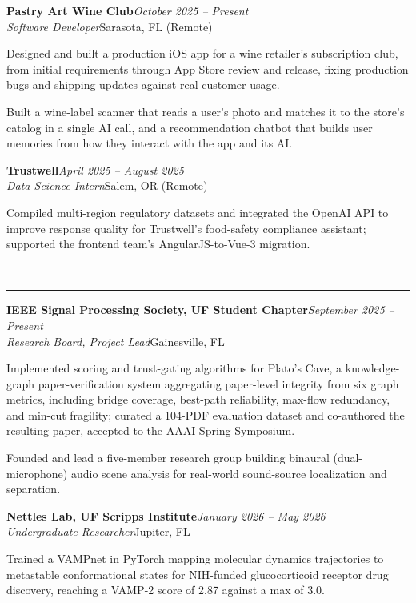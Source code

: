 \documentclass[10pt,letterpaper]{article}
\newcommand{\rsection}[1]{%
  \vspace{0.3em}%
  \noindent{\bfseries\scshape #1}\\[-0.42em]
  \noindent\rule{\textwidth}{0.6pt}\par\vspace{0.12em}%
}
\newenvironment{tight}{%
  \begin{list}{\textbullet}{%
    \setlength{\leftmargin}{1.1em}%
    \setlength{\labelwidth}{0.8em}%
    \setlength{\labelsep}{0.4em}%
    \setlength{\itemsep}{0.03em}%
    \setlength{\parsep}{0pt}%
    \setlength{\topsep}{0.09em}%
    \setlength{\partopsep}{0pt}%
    \setlength{\listparindent}{0pt}%
  }%
}{\end{list}}
\newcommand{\entry}[4]{%
  \vspace{0.12em}%
  \noindent\textbf{#1}\hfill\textit{#2}\\[0.02em]
  \noindent\textit{#3}\hfill{\small #4}\par\vspace{0.02em}%
}
\begin{document}
\entry{Pastry Art Wine Club}{October 2025 -- Present}{Software Developer}{Sarasota, FL (Remote)}
\begin{tight}
  \item Designed and built a production iOS app for a wine retailer's subscription club, from initial requirements through App Store review and release, fixing production bugs and shipping updates against real customer usage.
  \item Built a wine-label scanner that reads a user's photo and matches it to the store's catalog in a single AI call, and a recommendation chatbot that builds user memories from how they interact with the app and its AI.
\end{tight}

\entry{Trustwell}{April 2025 -- August 2025}{Data Science Intern}{Salem, OR (Remote)}
\begin{tight}
  \item Compiled multi-region regulatory datasets and integrated the OpenAI API to improve response quality for Trustwell's food-safety compliance assistant; supported the frontend team's AngularJS-to-Vue-3 migration.
\end{tight}

\rsection{Research \& Leadership}

\entry{IEEE Signal Processing Society, UF Student Chapter}{September 2025 -- Present}{Research Board, Project Lead}{Gainesville, FL}
\begin{tight}
  \item Implemented scoring and trust-gating algorithms for Plato's Cave, a knowledge-graph paper-verification system aggregating paper-level integrity from six graph metrics, including bridge coverage, best-path reliability, max-flow redundancy, and min-cut fragility; curated a 104-PDF evaluation dataset and co-authored the resulting paper, accepted to the AAAI Spring Symposium.
  \item Founded and lead a five-member research group building binaural (dual-microphone) audio scene analysis for real-world sound-source localization and separation.
\end{tight}

\entry{Nettles Lab, UF Scripps Institute}{January 2026 -- May 2026}{Undergraduate Researcher}{Jupiter, FL}
\begin{tight}
  \item Trained a VAMPnet in PyTorch mapping molecular dynamics trajectories to metastable conformational states for NIH-funded glucocorticoid receptor drug discovery, reaching a VAMP-2 score of 2.87 against a max of 3.0.
\end{tight}
\end{document}
